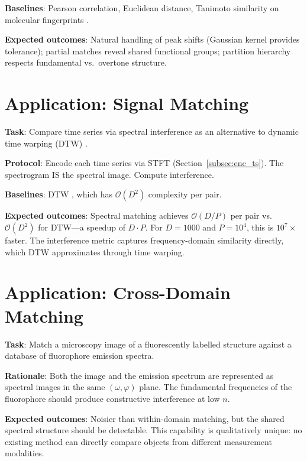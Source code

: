 \documentclass[11pt,twocolumn,a4paper]{article}
\newcommand{\BigO}{\mathcal{O}}
\begin{document}
\textbf{Baselines}: Pearson correlation, Euclidean distance, Tanimoto
similarity on molecular fingerprints \citep{willett1998}.

\textbf{Expected outcomes}: Natural handling of peak shifts (Gaussian
kernel provides tolerance); partial matches reveal shared functional
groups; partition hierarchy respects fundamental vs.\ overtone structure.


\section{Application: Signal Matching}
\label{sec:app_signal}

\textbf{Task}: Compare time series via spectral interference as an
alternative to dynamic time warping (DTW) \citep{sakoe1978}.

\textbf{Protocol}: Encode each time series via STFT
(Section~\ref{subsec:enc_ts}). The spectrogram IS the spectral image.
Compute interference.

\textbf{Baselines}: DTW \citep{sakoe1978, berndt1994}, which has
$\BigO(D^2)$ complexity per pair.

\textbf{Expected outcomes}: Spectral matching achieves $\BigO(D/P)$ per
pair vs.\ $\BigO(D^2)$ for DTW---a speedup of $D \cdot P$. For
$D = 1000$ and $P = 10^4$, this is $10^7 \times$ faster. The
interference metric captures frequency-domain similarity directly,
which DTW approximates through time warping.


\section{Application: Cross-Domain Matching}
\label{sec:app_cross}

\textbf{Task}: Match a microscopy image of a fluorescently labelled
structure against a database of fluorophore emission spectra.

\textbf{Rationale}: Both the image and the emission spectrum are
represented as spectral images in the same $(\omega, \varphi)$ plane.
The fundamental frequencies of the fluorophore should produce
constructive interference at low $n$.

\textbf{Expected outcomes}: Noisier than within-domain matching, but the
shared spectral structure should be detectable. This capability is
qualitatively unique: no existing method can directly compare objects
from different measurement modalities.
\end{document}
